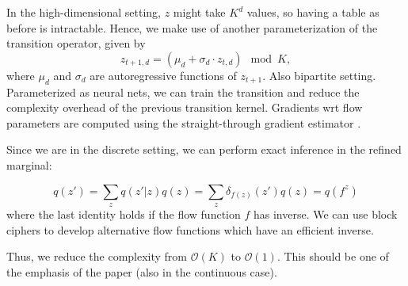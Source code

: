 In the high-dimensional setting, $z$ might take $K^d$ values, so having a table as before is intractable. Hence, we make use of another parameterization of the transition operator, given by
$$
z_{t+1,d} = (\mu_d + \sigma_d \cdot z_{t,d}) \mod K,
$$
where $\mu_d$ and $\sigma_d$ are autoregressive functions of $z_{t+1}$. Also bipartite setting. Parameterized as neural nets, we can train the transition and reduce the complexity overhead of the previous transition kernel. Gradients wrt flow parameters are computed using the straight-through gradient estimator \parencite{bengio2013estimating}.

Since we are in the discrete setting, we can perform exact inference in the refined marginal:

$$
q(z') = \sum_{z} q(z'|z)q(z) = \sum_{z} \delta_{f(z)}(z') q(z) = q(f^{z})
$$
where the last identity holds if the flow function $f$ has inverse. We can use block ciphers to develop alternative flow functions which have an efficient inverse.

Thus, we reduce the complexity from $\mathcal{O}(K)$ to $\mathcal{O}(1)$. This should be one of the emphasis of the paper (also in the continuous case).




\fi


\iffalse
